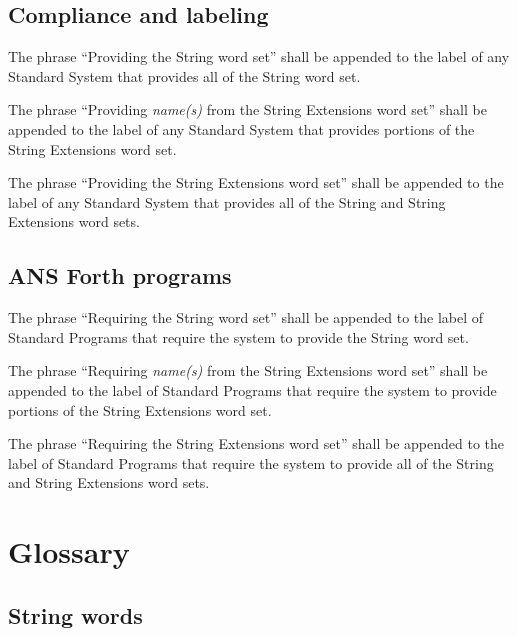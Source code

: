 \subsection{Compliance and labeling} %

The phrase ``Providing the String word set'' shall be appended to
the label of any Standard System that provides all of the String
word set.

The phrase ``Providing \emph{name(s)} from the String Extensions
word set'' shall be appended to the label of any Standard System
that provides portions of the String Extensions word set.

The phrase ``Providing the String Extensions word set'' shall be
appended to the label of any Standard System that provides all of
the String and String Extensions word sets.

\subsection{ANS Forth programs} %

The phrase ``Requiring the String word set'' shall be appended to
the label of Standard Programs that require the system to provide
the String word set.

The phrase ``Requiring \emph{name(s)} from the String Extensions
word set'' shall be appended to the label of Standard Programs that
require the system to provide portions of the String Extensions
word set.

The phrase ``Requiring the String Extensions word set'' shall be
appended to the label of Standard Programs that require the system
to provide all of the String and String Extensions word sets.


\section{Glossary} %

\subsection{String words} %


